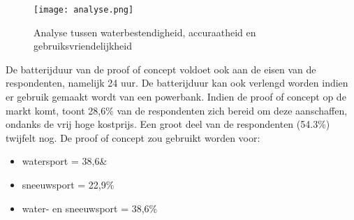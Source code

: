 \newline
\begin{figure}
	\texttt{[image: analyse.png]}
	\caption[Analyse tussen waterbestendigheid, accuraatheid en gebruiksvriendelijkheid]{Analyse tussen waterbestendigheid, accuraatheid en gebruiksvriendelijkheid}
	\label{graph:analyse}
\end{figure}
De batterijduur van de proof of concept voldoet ook aan de eisen van de respondenten, namelijk 24 uur. De batterijduur kan ook verlengd worden indien er gebruik gemaakt wordt van een powerbank.
\newline
Indien de proof of concept op de markt komt, toont 28,6\% van de respondenten zich bereid om deze aanschaffen, ondanks de vrij hoge kostprijs. Een groot deel van de respondenten (54.3\%) twijfelt nog. 
\newline
De proof of concept zou gebruikt worden voor:
\begin{itemize}
	\item watersport = 38,6\&
	\item sneeuwsport = 22,9\%
	\item water- en sneeuwsport = 38,6\%
\end{itemize}
\pagebreak
